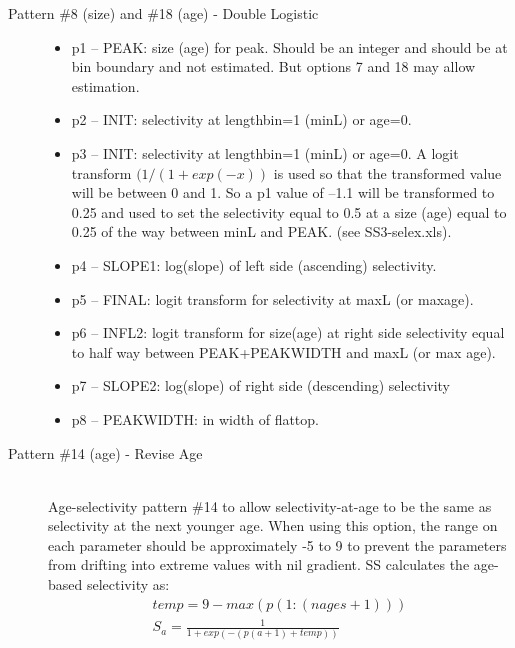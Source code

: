 \begin{description}
	\item[Pattern \#8 (size) and \#18 (age) - Double Logistic]\hfil
	\begin{itemize}
		\item  p1 – PEAK:  size (age) for peak. Should be an integer and should be at bin boundary and not estimated.  But options 7 and 18 may allow estimation.
		\item p2 – INIT:  selectivity at lengthbin=1 (minL) or age=0.
		\item p3 – INIT:  selectivity at lengthbin=1 (minL) or age=0. A logit transform $(1/(1+exp(-x))$ is used so that the transformed value will be between 0 and 1.  So a p1 value of –1.1 will be transformed to 0.25 and used to set the selectivity equal to 0.5 at a size (age) equal to 0.25 of the way between minL and PEAK.  (see SS3-selex.xls).
		\item p4 – SLOPE1:  log(slope) of left side (ascending) selectivity.
		\item p5 – FINAL:  logit transform for selectivity at maxL (or maxage).
		\item p6 – INFL2:  logit transform for size(age) at right side selectivity equal to half way between PEAK+PEAKWIDTH and maxL (or max age).
		\item p7 – SLOPE2:  log(slope) of right side (descending) selectivity
		\item p8 – PEAKWIDTH:  in width of flattop.
	\end{itemize}
\end{description}

\begin{description}
	\item[Pattern \#14 (age) - Revise Age]\hfil\\
	Age-selectivity pattern \#14 to allow selectivity-at-age to be the same as selectivity at the next younger age.  When using this option, the range on each parameter should be approximately -5 to 9 to prevent the parameters from drifting into extreme values with nil gradient. SS calculates the age-based selectivity as:
	\begin{equation}
		 \begin{split}
		 temp = 9 - max(p(1:(nages+1)))\\
		S_a = \frac{1}{1+exp(-(p(a+1) + temp))}
		\end{split}
	\end{equation}	
\end{description}

